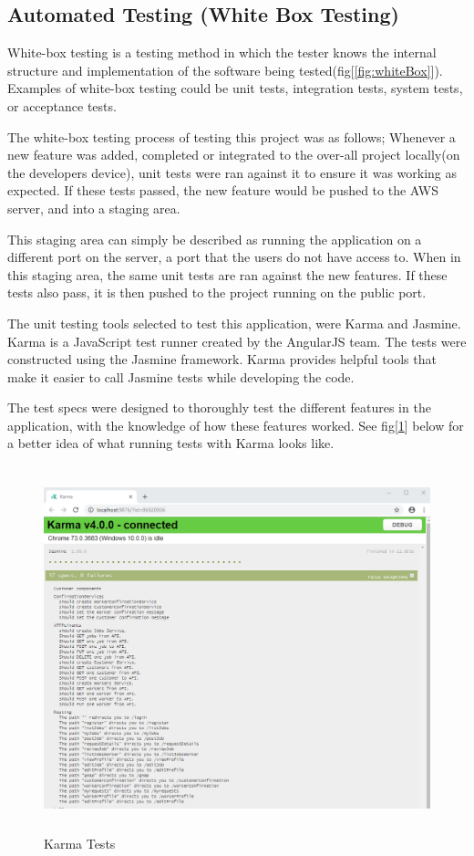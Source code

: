 \bigskip

\subsection{Automated Testing (White Box Testing)}
\label{sec:MethodologyWhiteBox}
White-box testing is a testing method in which the tester knows the internal structure and implementation of the software being tested(fig[\ref{fig:whiteBox}]). Examples of white-box testing could be unit tests, integration tests, system tests, or acceptance tests. 

\bigskip

The white-box testing process of testing this project was as follows; Whenever a new feature was added, completed or integrated to the over-all project locally(on the developers device), unit tests were ran against it to ensure it was working as expected. If these tests passed, the new feature would be pushed to the AWS server, and into a staging area.

This staging area can simply be described as running the application on a different port on the server, a port that the users do not have access to. When in this staging area, the same unit tests are ran against the new features. If these tests also pass, it is then pushed to the project running on the public port.

The unit testing tools selected to test this application, were Karma and Jasmine. Karma is a JavaScript test runner created by the AngularJS team. The tests were constructed using the Jasmine framework. Karma provides helpful tools that make it easier to call Jasmine tests while developing the code.

The test specs were designed to thoroughly test the different features in the application, with the knowledge of how these features worked. See fig[\ref{fig:karma}] below for a better idea of what running tests with Karma looks like.

\bigskip

\begin{figure}[H]
    \centering
    \includegraphics[width=\textwidth, height=300pt]{KarmaTests.PNG}
    \caption{Karma Tests}
    \label{fig:karma}
\end{figure}

